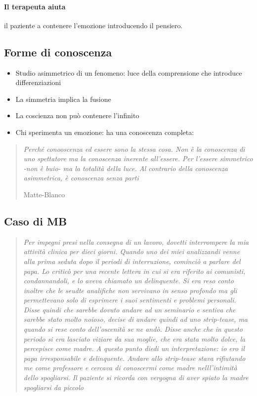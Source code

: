 \documentclass[12pt, a4paper]{article}
\begin{document}
\paragraph{Il terapeuta aiuta} il paziente a contenere l'emozione introducendo il pensiero.

\subsection{Forme di conoscenza}

\begin{itemize}
    \item Studio asimmetrico di un fenomeno: luce della comprensione che introduce differenziazioni
    \item La simmetria implica la fusione
    \item La coscienza non può contenere l'infinito     
    \item Chi sperimenta un emozione: ha una conoscenza completa:
\end{itemize}

\begin{quote}
    \emph{Perché conooscenza ed essere sono la stessa cosa. Non è la co\-no\-scenza di uno spettatore ma la conoscenza inerente all'essere. Per l'essere simmetrico -non è buio- ma la totalità della luce. Al contrario della conoscenza asimmetrica, è conoscenza senza parti}
    \begin{flushright}
        Matte-Blanco
    \end{flushright}
\end{quote}


\subsection{Caso di MB}

\begin{quote}
    \emph{Per impegni presi nella consegna di un lavoro, dovetti interrom\-pere la mia attività clinica per dieci giorni. Quando uno dei miei analizzandi venne alla prima seduta dopo il periodi di interruzione, cominciò a parlare del papa. Lo criticò per una recente lettera in cui si era riferito ai comunisti, condannandoli, e lo aveva chiamato un delinquente. Si era reso conto inoltre che le seudte analifiche non servivano in senso profondo ma gli
    permettevano solo di esprimere i suoi sentimenti e problemi personali. Disse quindi che sarebbe dovuto andare ad un seminario e sentiva che sarebbe stato molto noioso, decise di andare quindi ad uno strip-tease, ma quando si rese conto dell'oscenità se ne andò. Disse anche che in questo periodo si era lasciato viziare da sua moglie, che era stata molto dolce, la percepisce come madre.}
    \emph{A questo punto diedi un interpretazione: io ero il papa irresponsabile e delinquente. Andare allo strip-tease stava rifiutando me come professore e cercava di conoscermi come madre nelll'intimità dello spogliarsi.}
    \emph{Il paziente si ricorda con vergogna di aver spiato la madre spogliarsi da piccolo}
\end{quote}
\end{document}
